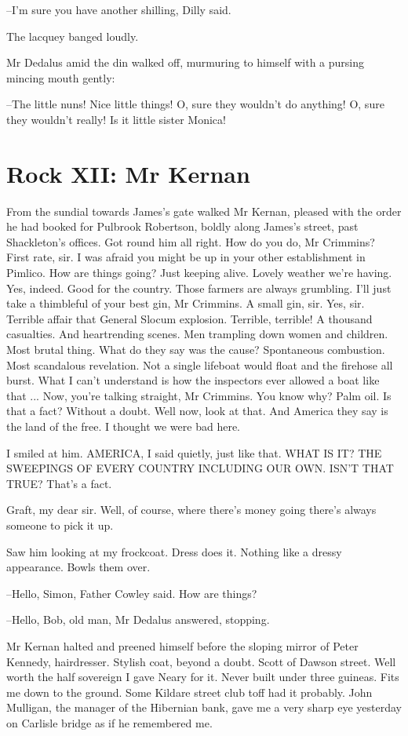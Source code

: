 --I'm sure you have another shilling,
Dilly said.

The lacquey banged loudly.

Mr Dedalus amid the din walked off,
murmuring to himself with a
pursing mincing mouth gently:

--The little nuns!
Nice little things!
O, sure they wouldn't do anything!
O, sure they wouldn't really!
Is it little sister Monica!


\section*{Rock XII: Mr Kernan}


From the sundial
towards James's gate
walked Mr Kernan,
pleased with the order he had booked for Pulbrook Robertson,
boldly along James's street,
past Shackleton's offices.
Got round him all right.
How do you do, Mr Crimmins?
First rate, sir.
I was afraid you might be up in your other establishment in Pimlico.
How are things going?
Just keeping alive.
Lovely weather we're having.
Yes, indeed.
Good for the country.
Those farmers are always grumbling.
I'll just take a thimbleful of your best gin, Mr Crimmins.
A small gin, sir.
Yes, sir.
Terrible affair that
General Slocum explosion.
Terrible, terrible!
A thousand casualties.
And heartrending scenes.
Men trampling down women and children.
Most brutal thing.
What do they say was the cause?
Spontaneous combustion.
Most scandalous revelation.
Not a single lifeboat would float and the firehose all burst.
What I can't understand
is how the inspectors ever allowed a boat like that ...
Now, you're talking straight, Mr Crimmins.
You know why?
Palm oil.
Is that a fact?
Without a doubt.
Well now, look at that.
And America they say is the land of the free.
I thought we were bad here.

I smiled at him.
AMERICA,
I said quietly,
just like that.
WHAT IS IT?
THE
SWEEPINGS OF EVERY COUNTRY INCLUDING OUR OWN.
ISN'T THAT TRUE?
That's a
fact.

Graft,
my dear sir.
Well, of course, where there's money going
there's
always someone to pick it up.

Saw him looking at my frockcoat.
Dress does it.
Nothing like a dressy
appearance.
Bowls them over.

--Hello, Simon,
Father Cowley said.
How are things?

--Hello, Bob, old man,
Mr Dedalus answered,
stopping.

Mr Kernan halted and preened himself
before the sloping mirror of Peter
Kennedy, hairdresser.
Stylish coat, beyond a doubt.
Scott of Dawson
street.
Well worth the half sovereign I gave Neary for it.
Never built
under three guineas.
Fits me down to the ground.
Some Kildare street club
toff had it probably.
John Mulligan, the manager of the Hibernian bank,
gave me a very sharp eye yesterday
on Carlisle bridge as if he remembered
me.

